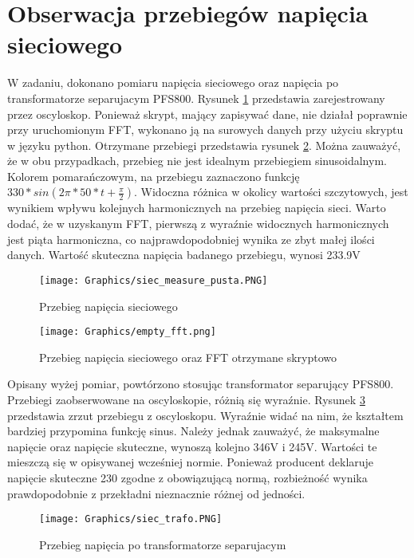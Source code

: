 \section{Obserwacja przebiegów napięcia sieciowego}
\label{sec:voltage_not_connected}
W zadaniu, dokonano pomiaru napięcia sieciowego oraz napięcia po transformatorze separujacym PFS800. Rysunek \ref{img:empty_measurement} przedstawia zarejestrowany przez oscyloskop. Ponieważ skrypt, mający zapisywać dane, nie działał poprawnie przy uruchomionym FFT, wykonano ją na surowych danych przy użyciu skryptu w języku python. Otrzymane przebiegi przedstawia rysunek \ref{img:emmpty_fft}. Można zauważyć, że w obu przypadkach, przebieg nie jest idealnym przebiegiem sinusoidalnym. Kolorem pomarańczowym, na przebiegu zaznaczono funkcję $ 330 * sin(2\pi * 50 * t + \frac{\pi}{2}) $. Widoczna różnica w okolicy wartości szczytowych, jest wynikiem wpływu kolejnych harmonicznych na przebieg napięcia sieci. Warto dodać, że w uzyskanym FFT, pierwszą z wyraźnie widocznych harmonicznych jest piąta harmoniczna, co najprawdopodobniej wynika ze zbyt małej ilości danych.\newline
Wartość skuteczna napięcia badanego przebiegu, wynosi 233.9V 


\begin{figure}[H]
    \centering
    \texttt{[image: Graphics/siec\_measure\_pusta.PNG]}
    \caption{Przebieg napięcia sieciowego}
    \label{img:empty_measurement}
\end{figure}

\begin{figure}[H]
    \centering
    \texttt{[image: Graphics/empty\_fft.png]}
    \caption{Przebieg napięcia sieciowego oraz FFT otrzymane skryptowo}
    \label{img:emmpty_fft}
\end{figure}

Opisany wyżej pomiar, powtórzono stosując transformator separujący PFS800. Przebiegi zaobserwowane na oscyloskopie, różnią się wyraźnie. Rysunek \ref{img:trafo_measurement} przedstawia zrzut przebiegu z oscyloskopu. Wyraźnie widać na nim, że kształtem bardziej przypomina funkcję sinus. Należy jednak zauważyć, że maksymalne napięcie oraz napięcie skuteczne, wynoszą kolejno 346V i 245V. Wartości te mieszczą się w opisywanej wcześniej normie. Ponieważ producent deklaruje napięcie skuteczne 230 zgodne z obowiązującą normą, rozbieżność wynika prawdopodobnie z przekładni nieznacznie różnej od jedności.

\begin{figure}[H]
    \centering
    \texttt{[image: Graphics/siec\_trafo.PNG]}
    \caption{Przebieg napięcia po transformatorze separujacym}
    \label{img:trafo_measurement}
\end{figure}

